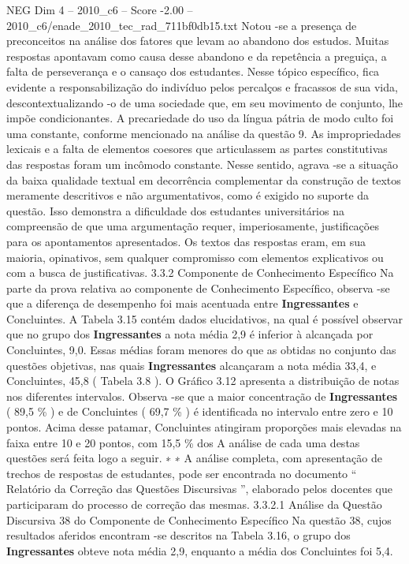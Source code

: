 \begin{textsample}{NEG Dim 4 – 2010\_c6 – Score -2.00 – 2010\_c6/enade\_2010\_tec\_rad\_711bf0db15.txt}
Notou -se a presença de preconceitos na análise dos fatores que levam ao abandono dos estudos.
Muitas respostas apontavam como causa desse abandono e da repetência a preguiça, a falta de perseverança e o cansaço dos estudantes.
Nesse tópico específico, fica evidente a responsabilização do indivíduo pelos percalços e fracassos de sua vida, descontextualizando -o de uma sociedade que, em seu movimento de conjunto, lhe impõe condicionantes.
A precariedade do uso da língua pátria de modo culto foi uma constante, conforme mencionado na análise da questão 9.
As impropriedades lexicais e a falta de elementos coesores que articulassem as partes constitutivas das respostas foram um incômodo constante.
Nesse sentido, agrava -se a situação da baixa qualidade textual em decorrência complementar da construção de textos meramente descritivos e não argumentativos, como é exigido no suporte da questão.
Isso demonstra a dificuldade dos estudantes universitários na compreensão de que uma argumentação requer, imperiosamente, justificações para os apontamentos apresentados.
Os textos das respostas eram, em sua maioria, opinativos, sem qualquer compromisso com elementos explicativos ou com a busca de justificativas. 3.3.2 Componente de Conhecimento Específico Na parte da prova relativa ao componente de Conhecimento Específico, observa -se que a diferença de desempenho foi mais acentuada entre \textbf{Ingressantes} e Concluintes.
A Tabela 3.15 contém dados elucidativos, na qual é possível observar que no grupo dos \textbf{Ingressantes} a nota média 2,9 é inferior à alcançada por Concluintes, 9,0.
Essas médias foram menores do que as obtidas no conjunto das questões objetivas, nas quais \textbf{Ingressantes} alcançaram a nota média 33,4, e Concluintes, 45,8 ( Tabela 3.8 ).
O Gráfico 3.12 apresenta a distribuição de notas nos diferentes intervalos.
Observa -se que a maior concentração de \textbf{Ingressantes} ( 89,5 \% ) e de Concluintes ( 69,7 \% ) é identificada no intervalo entre zero e 10 pontos.
Acima desse patamar, Concluintes atingiram proporções mais elevadas na faixa entre 10 e 20 pontos, com 15,5 \% dos A análise de cada uma destas questões será feita logo a seguir. ∗ ∗ A análise completa, com apresentação de trechos de respostas de estudantes, pode ser encontrada no documento “ Relatório da Correção das Questões Discursivas ”, elaborado pelos docentes que participaram do processo de correção das mesmas. 3.3.2.1 Análise da Questão Discursiva 38 do Componente de Conhecimento Específico Na questão 38, cujos resultados aferidos encontram -se descritos na Tabela 3.16, o grupo dos \textbf{Ingressantes} obteve nota média 2,9, enquanto a média dos Concluintes foi 5,4.

\end{textsample}

